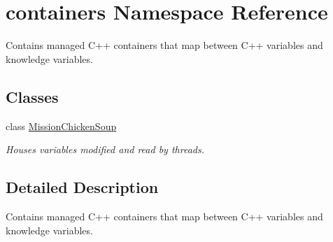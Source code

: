 \hypertarget{namespacecontainers}{}\section{containers Namespace Reference}
\label{namespacecontainers}


Contains managed C++ containers that map between C++ variables and knowledge variables.  


\subsection*{Classes}
\begin{DoxyCompactItemize}
\item 
class \hyperlink{classcontainers_1_1MissionChickenSoup}{Mission\+Chicken\+Soup}
\begin{DoxyCompactList}\small\item\em Houses variables modified and read by threads. \end{DoxyCompactList}\end{DoxyCompactItemize}


\subsection{Detailed Description}
Contains managed C++ containers that map between C++ variables and knowledge variables. 